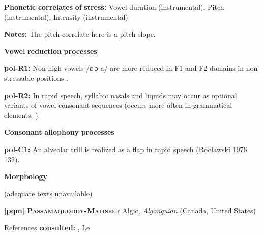 \begin{styleBody}
\textbf{Phonetic} \textbf{correlates} \textbf{of} \textbf{stress:} Vowel duration (instrumental), Pitch (instrumental), Intensity (instrumental)
\end{styleBody}

\begin{styleBody}
\textbf{Notes:} The pitch correlate here is a pitch slope.
\end{styleBody}

\begin{styleBody}
\textbf{Vowel} \textbf{reduction} \textbf{processes}
\end{styleBody}

\begin{styleBody}
\textbf{pol-R1:} Non-high vowels /ɛ ɔ a/ are more reduced in F1 and F2 domains in non-stressable positions \citep[378-9]{Nowak2006}.
\end{styleBody}

\begin{styleBody}
\textbf{pol-R2:} In rapid speech, syllabic nasals and liquids may occur as optional variants of vowel-consonant sequences (occurs more often in grammatical elements; \citealt{Rubach1974}).
\end{styleBody}

\begin{styleBody}
\textbf{Consonant} \textbf{allophony} \textbf{processes}
\end{styleBody}

\begin{styleBody}
\textbf{pol-C1:} An alveolar trill is realized as a flap in rapid speech (Rocławski 1976: 132).
\end{styleBody}

\begin{styleBody}
\textbf{Morphology}
\end{styleBody}

\begin{styleBody}
(adequate texts unavailable)
\end{styleBody}

\begin{styleBody}
\textbf{[pqm]}   \textbf{\textsc{Passamaquoddy-Maliseet}}  Algic, \textit{Algonquian} (Canada, United States)
\end{styleBody}

\begin{styleBody}
References \textbf{consulted:} \citet{Leavitt1996}, Le\citet{Sourd1993}
\end{styleBody}

